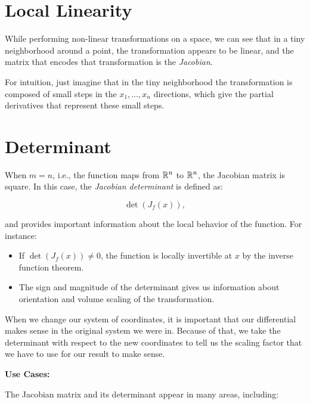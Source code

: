 \section{Local Linearity}

While performing non-linear transformations on a space, we can see that in a tiny neighborhood
around a point, the transformation appears to be linear, and the matrix that encodes that
transformation is the \emph{Jacobian}.

For intuition, just imagine that in the tiny neighborhood the transformation is composed
of small steps in the \(x_1, \dots, x_n\) directions, which give the partial derivatives that
represent these small steps. 

\section{Determinant}

When \(m = n\), i.e., the function maps from \(\mathbb{R}^n\) to \(\mathbb{R}^n\), the Jacobian matrix is square. 
In this case, the \emph{Jacobian determinant} is defined as:

\[
    \det(J_{f}(x)),
\]

and provides important information about the local behavior of the function. For instance:

\begin{itemize}

    \item If \(\det(J_{f}(x)) \neq 0\), the function is locally invertible at \(x\) by the inverse 
      function theorem.
  
      \item The sign and magnitude of the determinant 
      gives us information about orientation and volume scaling of the transformation.

\end{itemize}

When we change our system of coordinates, it is important that our differential makes sense in the original 
system we were in. Because of that, we take the determinant with respect to the new coordinates to tell us 
the scaling factor that we have to use for our result to make sense.

\textbf{Use Cases:}

The Jacobian matrix and its determinant appear in many areas, including:


